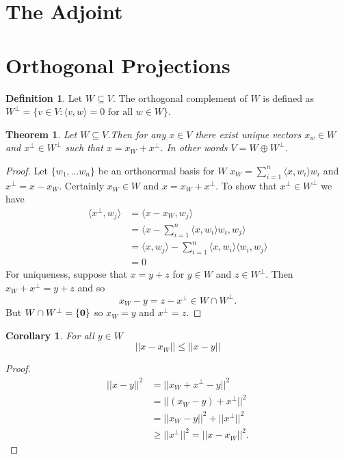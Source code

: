 \documentclass[oneside, 12pt]{book}
\newtheorem{thm}{Theorem}[section]
\newtheorem{cor}{Corollary}[section]
\theoremstyle{definition}
\newtheorem{defn}{Definition}[section]
\begin{document}
\section{The Adjoint}
\section{Orthogonal Projections}
\begin{defn}
\label{orthcomp}
Let $W \subseteq V$. The orthogonal complement of $W$ is defined as $W^{\perp}=\{v \in V : \langle v, w \rangle=0 \text{ for all } w \in W\}$.
\end{defn}

\begin{thm}
\label{thm_orthodecomp}
  Let $W \subseteq V$.Then for any $x \in V$ there exist unique vectors $x_{w} \in W$ and $x^{\perp} \in W^{\perp}$ such that $x=x_{W}+x^{\perp}$. In other words $V=W \oplus W^{\perp}$.
\end{thm}
\begin{proof}
  Let $\{w_{1}, \dots w_{n}\}$ be an orthonormal basis for $W$ $x_{W}=\sum_{i=1}^{n}\langle x, w_{i} \rangle w_{i}$ and $x^{\perp}=x-x_{W}$. Certainly $x_{W} \in W$ and $x=x_{W}+x^{\perp}$. To show that $x^{\perp} \in W^{\perp}$ we have
  \begin{align}
    \langle x^{\perp},w_{j}\rangle &= \langle x-x_{W}, w_{j} \rangle \\
                   &= \langle x- \sum_{i=1}^{n} \langle x, w_{i} \rangle w_{i}, w_{j} \rangle \\
                   &= \langle x, w_{j} \rangle - \sum_{i=1}^{n}\langle x, w_{i} \rangle \langle w_{i}, w_{j} \rangle \\
    &= 0
  \end{align}
  For uniqueness, suppose that $x=y+z$ for $y \in W$ and $z \in W^{\perp}$. Then $x_{W}+x^{\perp}=y+z$ and so \[x_{W}-y=z-x^{\perp} \in W \cap W^{\perp}.\]
  But $W \cap W^{\perp}=\{\bold{0}\}$ so $x_{W}=y$ and $x^{\perp}=z$.
\end{proof}
\begin{cor}
  \label{cor_min}
For all $y \in W$ \[||x-x_{W}||\leq ||x-y||\]
\end{cor}
\begin{proof}
\begin{align}
  ||x-y||^{2} &= ||x_{W}+x^{\perp}-y||^{2} \\
              &=||(x_{W}-y)+x^{\perp}||^{2} \\
              &= ||x_{W}-y||^{2}+||x^{\perp}||^{2} \\
              &\geq ||x^{\perp}||^{2} = ||x-x_{W}||^{2}.
\end{align}
\end{proof}
\end{document}
